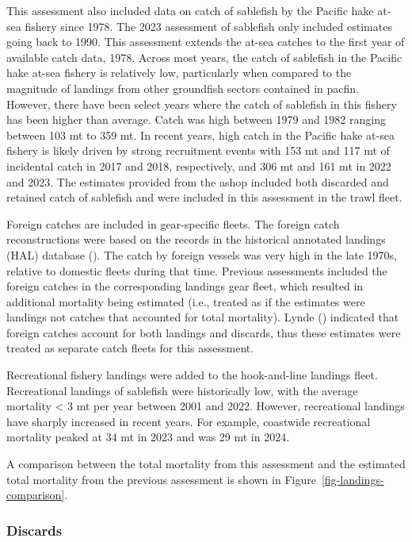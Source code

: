 \documentclass[
  english,
]{article}
\begin{document}
This assessment also included data on catch of sablefish by the Pacific
hake at-sea fishery since 1978. The 2023 assessment of sablefish only
included estimates going back to 1990. This assessment extends the
at-sea catches to the first year of available catch data, 1978. Across
most years, the catch of sablefish in the Pacific hake at-sea fishery is
relatively low, particularly when compared to the magnitude of landings
from other groundfish sectors contained in \gls{pacfin}. However, there
have been select years where the catch of sablefish in this fishery has
been higher than average. Catch was high between 1979 and 1982 ranging
between 103 mt to 359 mt. In recent years, high catch in the Pacific
hake at-sea fishery is likely driven by strong recruitment events with
153 mt and 117 mt of incidental catch in 2017 and 2018, respectively,
and 306 mt and 161 mt in 2022 and 2023. The estimates provided from the
\gls{ashop} included both discarded and retained catch of sablefish and
were included in this assessment in the trawl fleet.

Foreign catches are included in gear-specific fleets. The foreign catch
reconstructions were based on the records in the historical annotated
landings (HAL) database (). The catch by foreign vessels was very high in the late 1970s,
relative to domestic fleets during that time. Previous assessments
included the foreign catches in the corresponding landings gear fleet,
which resulted in additional mortality being estimated (i.e., treated as
if the estimates were landings not catches that accounted for total
mortality). Lynde () indicated
that foreign catches account for both landings and discards, thus these
estimates were treated as separate catch fleets for this assessment.

Recreational fishery landings were added to the hook-and-line landings
fleet. Recreational landings of sablefish were historically low, with
the average mortality \textless{} 3 mt per year between 2001 and 2022.
However, recreational landings have sharply increased in recent years.
For example, coastwide recreational mortality peaked at 34 mt in 2023
and was 29 mt in 2024.

A comparison between the total mortality from this assessment and the
estimated total mortality from the previous assessment is shown in
Figure~\ref{fig-landings-comparison}.

\subsubsection{Discards}\label{discards}
\end{document}
